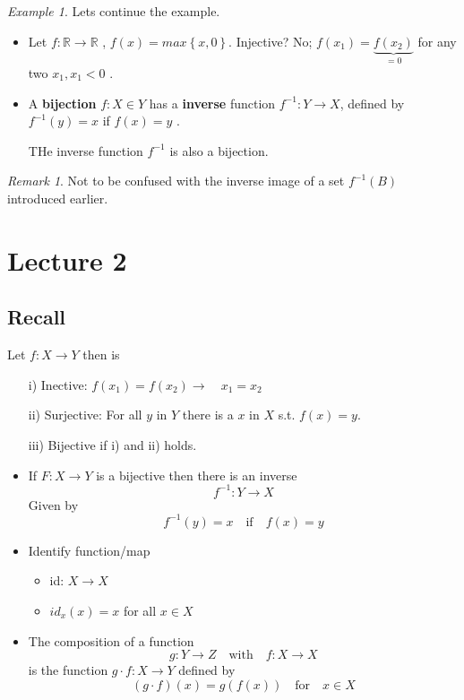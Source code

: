 \documentclass{article}
\theoremstyle{remark}
\newtheorem*{remark}{Remark}
\newtheorem{example}{Example}
\begin{document}
\begin{example}
  Lets continue the example.
  \begin{itemize}
    \item
  Let $f: \mathbb{R} \to \mathbb{R} $ , $f\left( x \right) = max \left\{ x,0 \right\}$. Injective? No; $f\left( x_{1} \right) = \underbrace{f\left( x_{2} \right)}_\text{$= 0$}  $ for any two $x_{1}, x_{1} < 0$ .
\item  A \textbf{bijection}  $f:  X \in Y$ has a \textbf{inverse}  function $f^{-1} : Y \to X$, defined by $f^{-1} \left( y \right) = x$ if $f\left( x \right) = y$ . \par
  THe inverse function $f^{-1} $ is also a bijection. 
  \end{itemize}
\end{example}
\begin{remark}
  Not to be confused with the inverse image of a set $f^{-1} \left( B \right) $ introduced earlier.
\end{remark}

\newpage
\section{Lecture 2}%
\label{sec:lecture_2}

\subsection{Recall}%
\label{sub:recall}

Let $f: X \to Y$ then is 
\begin{itemize}
  \item[i)] Inective: $f\left( x_{1} \right) = f\left( x_{2} \right) \to \quad x_{1} = x_{2} $ 
  \item [ii)] Surjective:  For all $y$ in $Y$ there is a $x$ in $X$ s.t. $f\left( x \right) = y$. 
  \item [iii)] Bijective if i) and ii) holds.
\end{itemize}


\begin{itemize}
  \item If $F: X \to Y$ is a bijective then there is an inverse \[
      f^{-1} : Y \to X
  \] 
  Given by \[
  f^{-1} \left( y \right) = x \quad  \text{if} \quad  f\left( x \right)   = y
  \] 
\item Identify function/map 
  \begin{itemize}
    \item id: $X \to X$
    \item $id_{x}\left( x \right) = x$ for all $x \in X$
  \end{itemize}
\item The composition of a function \[
    g: Y \to Z \quad  \text{with} \quad  f: X \to X  
\] is the function $g\cdot f : X \to Y$   defined by \[
\left( g\cdot f \right)\left( x \right) = g\left( f\left( x \right) \right) \quad  \text{for} \quad  x \in X  
\] 
\end{itemize}
\end{document}
